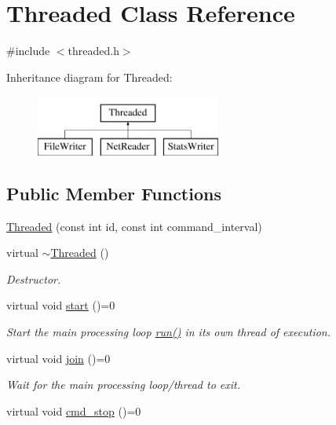\hypertarget{class_threaded}{
\section{Threaded Class Reference}
\label{class_threaded}
}


{\ttfamily \#include $<$threaded.h$>$}

Inheritance diagram for Threaded:\begin{figure}[H]
\begin{center}
\leavevmode
\includegraphics[height=2.000000cm]{class_threaded}
\end{center}
\end{figure}
\subsection*{Public Member Functions}
\begin{DoxyCompactItemize}
\item 
\hyperlink{class_threaded_a6236a842ddac09f974c58e17680d41c0}{Threaded} (const int id, const int command\_\-interval)
\item 
\hypertarget{class_threaded_af4018740c234ef4c815cccffe3b5842b}{
virtual \hyperlink{class_threaded_af4018740c234ef4c815cccffe3b5842b}{$\sim$Threaded} ()}
\label{class_threaded_af4018740c234ef4c815cccffe3b5842b}

\begin{DoxyCompactList}\small\item\em Destructor. \end{DoxyCompactList}\item 
\hypertarget{class_threaded_aea595e9821bf79d59e0bbcc146ddee93}{
virtual void \hyperlink{class_threaded_aea595e9821bf79d59e0bbcc146ddee93}{start} ()=0}
\label{class_threaded_aea595e9821bf79d59e0bbcc146ddee93}

\begin{DoxyCompactList}\small\item\em Start the main processing loop \hyperlink{class_threaded_a585d28f8e23a343428f62e0479dda13c}{run()} in its own thread of execution. \end{DoxyCompactList}\item 
\hypertarget{class_threaded_a1f6908a34c9981fa4afde713edd5571f}{
virtual void \hyperlink{class_threaded_a1f6908a34c9981fa4afde713edd5571f}{join} ()=0}
\label{class_threaded_a1f6908a34c9981fa4afde713edd5571f}

\begin{DoxyCompactList}\small\item\em Wait for the main processing loop/thread to exit. \end{DoxyCompactList}\item 
virtual void \hyperlink{class_threaded_a52a40998cd6f4b995ceaba12899b4212}{cmd\_\-stop} ()=0
\end{DoxyCompactItemize}

